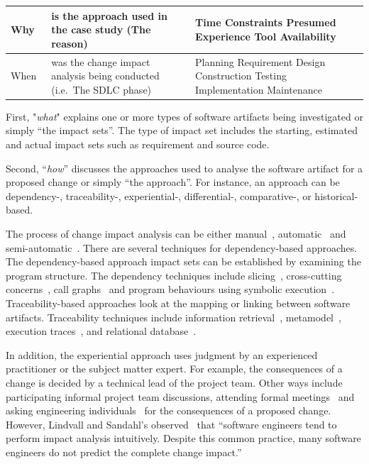 \documentclass[conference]{IEEEtran}
\begin{document}
\begin{table}
\begin{tabular}{ | l @{} p{3.5cm} | p{3.5cm}|  }
\hline
Why & is the approach used in the case study 
\newline (The reason) & Time Constraints 
\newline Presumed Experience 
\newline Tool Availability
\\

\hline
When~ & was the change impact analysis being conducted 
\newline (i.e.~The SDLC phase) & Planning 
\newline Requirement 
\newline Design 
\newline Construction 
\newline Testing 
\newline Implementation 
\newline Maintenance
\\
\hline
\end{tabular}
\end{table}


First, "\textit{what}" explains one or more types of software
artifacts being investigated or simply ``the impact sets''. The type
of impact set includes the starting, estimated and actual impact
sets such as requirement and source code.

Second, ``\textit{how}'' discusses the approaches used to analyse the
software artifact for a proposed change or simply ``the
approach''. For instance, an approach can be dependency-,
traceability-, experiential-, differential-, comparative-, or
historical-based.

The process of change impact analysis can
be either manual~\cite{wetzlmaier2015improving},
automatic~\cite{von2003quatrace,briand2002automating} and
semi-automatic~\cite{barros1995supporting}. There are several
techniques for dependency-based approaches. The dependency-based
approach impact sets can be established by examining the program
structure. The dependency techniques include
slicing~\cite{acharya2011practical}, cross-cutting
concerns~\cite{zhang2009impact}, call
graphs~\cite{badri2005supporting} and program behaviours using
symbolic execution~\cite{rungta2012change}. Traceability-based
approaches look at the mapping or linking between software
artifacts. Traceability techniques include information
retrieval~\cite{eaddy2008cerberus},
metamodel~\cite{galvao2007survey,goknil2014change}, execution
traces~\cite{ibrahim2005requirements}, and relational
database~\cite{omar2013software}.

In addition, the experiential approach uses judgment by an experienced
practitioner or the subject matter expert. For example, the
consequences of a change is decided by a technical lead of the project
team. Other ways include participating informal project team
discussions, attending formal meetings~\cite{raschke2014supporting}
and asking engineering individuals~\cite{endres2003handbook} for the
consequences of a proposed change. However, Lindvall and Sandahl’s
observed~\cite{lindvall1996practical} that ``software engineers tend
to perform impact analysis intuitively. Despite this common practice,
many software engineers do not predict the complete change impact.''
\end{document}
